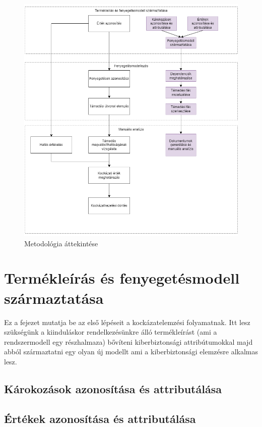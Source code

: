\begin{figure}[!ht]
	\centering
	\includegraphics[width=130mm, keepaspectratio]{figures/04_overview.png}
	\caption{Metodológia áttekintése}
	\label{fig:04_OVERVIEW}
\end{figure}

\section{Termékleírás és fenyegetésmodell származtatása}

Ez a fejezet mutatja be az első lépéseit a kockázatelemzési folyamatnak. Itt lesz szükségünk a kiinduláskor rendelkezésünkre álló termékleírást (ami a rendszermodell egy részhalmaza) bővíteni kiberbiztonsági attribútumokkal majd abból származtatni egy olyan új modellt ami a kiberbiztonsági elemzésre alkalmas lesz.

\subsection{Károkozások azonosítása és attributálása}



\subsection{Értékek azonosítása és attributálása}


